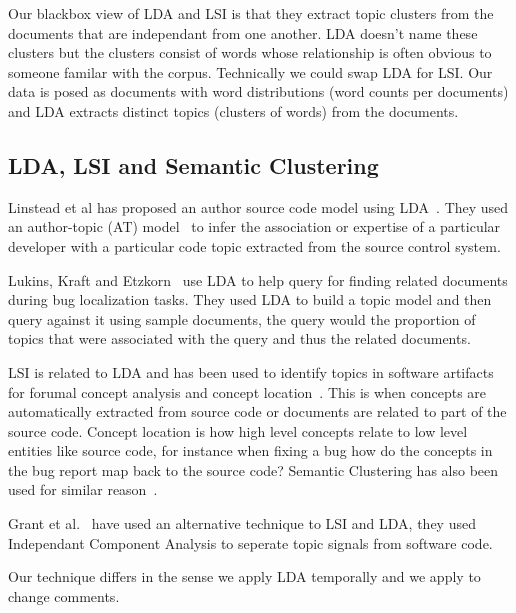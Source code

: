 \documentclass[times, 10pt,twocolumn]{article}
\begin{document}
Our blackbox view of LDA and LSI is that they extract topic clusters
from the documents that are independant from one another. LDA doesn't
name these clusters but the clusters consist of words whose
relationship is often obvious to someone familar with the
corpus. Technically we could swap LDA for LSI. Our data is posed as
documents with word distributions (word counts per documents) and LDA
extracts distinct topics (clusters of words) from the documents.

\subsection{LDA, LSI and Semantic Clustering}

Linstead et al has proposed an author source code model using
LDA~\cite{10.1109/MSR.2007.20,NIPS2007637,1321709}. They used an
author-topic (AT) model~\cite{1036902} to infer the association or
expertise of a particular developer with a particular code topic
extracted from the source control system.

Lukins, Kraft and Etzkorn~\cite{lukins2008} use LDA to help query for
finding related documents during bug localization tasks. They used LDA
to build a topic model and then query against it using sample
documents, the query would the proportion of topics that were
associated with the query and thus the related documents.

LSI is related to LDA and has been used to identify topics in software
artifacts for forumal concept analysis and concept
location~\cite{1421013,1374321,10.1109/ICPC.2007.13,10.1109/ICPC.2006.17}.
This is when concepts are automatically extracted from source code or
documents are related to part of the source code.  Concept location is
how high level concepts relate to low level entities like source code,
for instance when fixing a bug how do the concepts in the bug report
map back to the source code?  Semantic Clustering has also been used
for similar reason~\cite{1698774,1566153}.

Grant et al.~\cite{scottcordy} have used an alternative technique to
LSI and LDA, they used Independant Component Analysis to seperate
topic signals from software code.

Our technique differs in the sense we apply LDA temporally and we
apply to change comments.

\end{document}
